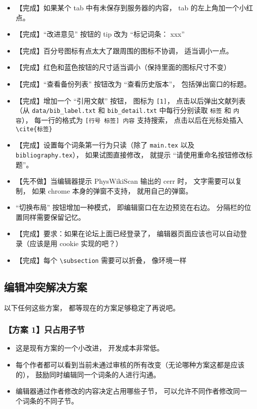 \begin{itemize}
\item 【完成】如果某个 tab 中有未保存到服务器的内容， tab 的左上角加一个小红点。

\item 【完成】“改进意见” 按钮的 tip 改为 “标记词条： xxx”

\item 【完成】百分号图标有点太大了跟周围的图标不协调， 适当调小一点。

\item 【完成】红色和蓝色按钮的尺寸适当调小（保持里面的图标尺寸不变）

\item 【完成】“查看备份列表” 按钮改为 “查看历史版本”， 包括弹出窗口的标题。

\item 【完成】增加一个 “引用文献” 按钮， 图标为 \verb|[1]|， 点击以后弹出文献列表（从 \verb|data/bib_label.txt| 和 \verb|bib_detail.txt| 中每行分别读取 \verb|标签| 和 \verb|内容|）， 每一行的格式为 \verb|[行号 标签] 内容| 支持搜索， 点击以后在光标处插入 \verb|\cite{标签}|

\item 【完成】设置每个词条第一行为只读（除了 \verb|main.tex| 以及 \verb|bibliography.tex|）， 如果试图直接修改， 就提示 “请使用重命名按钮修改标题”。

\item 【先不做】当编辑器提示 PhysWikiScan 输出的 cerr 时， 文字需要可以复制， 如果 chrome 本身的弹窗不支持， 就用自己的弹窗。

\item “切换布局” 按钮增加一种模式， 即编辑窗口在左边预览在右边。 分隔栏的位置同样需要保留记忆。

\item 【完成】要求：如果在论坛上面已经登录了， 编辑器页面应该也可以自动登录（应该是用 cookie 实现的吧？）

\item 【完成】每个 \verb|\subsection| 需要可以折叠， 像环境一样
\end{itemize}

\subsection{编辑冲突解决方案}

以下任何这些方案， 都等现在的方案足够稳定了再说吧。

\subsubsection{【方案 1】只占用子节}
\begin{itemize}
\item 这是现有方案的一个小改进， 开发成本非常低。
\item 每个作者都可以看到当前未通过审核的所有改变（无论哪种方案这都是应该的）， 鼓励同时编辑同一个词条的人进行沟通。
\item 编辑器通过作者修改的内容决定占用哪些子节， 可以允许不同作者修改同一个词条的不同子节。
\end{itemize}

